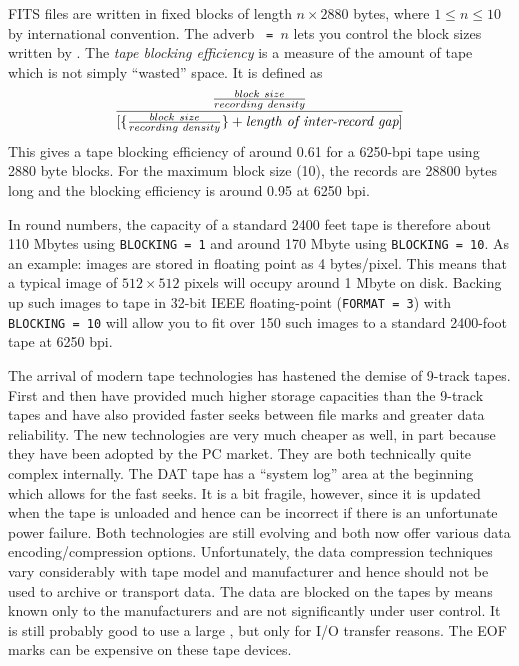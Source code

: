      FITS files are written in fixed blocks of length $n \times 2880$
bytes, where $1 \leq n \leq 10$ by international convention.  The
adverb {\tt {} = $n$} lets you control the block sizes
written by \hbox{{\tt {}}}.   The {\it tape blocking
efficiency} is a measure of the amount of tape which is not simply
``wasted'' space.  It is defined as
$$
   { {block~size \over recording~density} \over
      { \lbrack \lbrace {block~size \over recording~density} \rbrace
      + \text{\it{length~of~inter-record~gap}}} \rbrack }
$$
This gives a tape blocking efficiency of around 0.61 for a 6250-bpi
tape using 2880 byte blocks.  For the maximum block size (10), the
records are 28800 bytes long and the blocking efficiency is around
0.95 at 6250 bpi.

     In round numbers, the capacity of a standard 2400 feet tape is
therefore about 110 Mbytes using {\tt BLOCKING = 1} and around 170
Mbyte using {\tt BLOCKING = 10}.  As an example: images are stored in
floating point as 4 bytes/pixel.  This means that a typical image of
$512 \times 512$ pixels will occupy around 1 Mbyte on disk. Backing up
such images to tape in 32-bit IEEE floating-point ({\tt FORMAT = 3})
with {\tt BLOCKING = 10} will allow you to fit over 150 such images to
a standard 2400-foot tape at 6250 bpi.


     The arrival of modern tape technologies has hastened the demise
of 9-track tapes.  First  and then  have provided much higher storage capacities than the 9-track
tapes and have also provided faster seeks between file marks and
greater data reliability.  The new technologies are very much cheaper
as well, in part because they have been adopted by the PC market.
They are both technically quite complex internally.  The DAT tape has
a ``system log'' area at the beginning which allows for the fast
seeks.  It is a bit fragile, however, since it is updated when the
tape is unloaded and hence can be incorrect if there is an unfortunate
power failure.  Both technologies are still evolving and both now
offer various data encoding/compression options.  Unfortunately, the
data compression techniques vary considerably with tape model and
manufacturer and hence should not be used to archive or transport
data.  The data are blocked on the tapes by means known only to the
manufacturers and are not significantly under user control.  It is
still probably good to use a large {\tt {}}, but only for
I/O transfer reasons.  The EOF marks can be expensive on these tape
devices.

